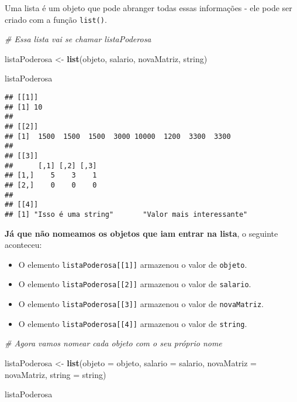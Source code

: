 \documentclass[
]{article}
\newenvironment{Shaded}{\begin{snugshade}}{\end{snugshade}}
\newcommand{\CommentTok}[1]{\textcolor[rgb]{0.56,0.35,0.01}{\textit{#1}}}
\newcommand{\DataTypeTok}[1]{\textcolor[rgb]{0.13,0.29,0.53}{#1}}
\newcommand{\KeywordTok}[1]{\textcolor[rgb]{0.13,0.29,0.53}{\textbf{#1}}}
\newcommand{\NormalTok}[1]{#1}
\newcommand{\StringTok}[1]{\textcolor[rgb]{0.31,0.60,0.02}{#1}}
\begin{document}
Uma lista é um objeto que pode abranger todas essas informações - ele
pode ser criado com a função \texttt{list()}.

\begin{Shaded}
\begin{Highlighting}[]
\CommentTok{# Essa lista vai se chamar listaPoderosa}

\NormalTok{listaPoderosa <-}\StringTok{ }\KeywordTok{list}\NormalTok{(objeto, salario, novaMatriz, string)}

\NormalTok{listaPoderosa}
\end{Highlighting}
\end{Shaded}

\begin{verbatim}
## [[1]]
## [1] 10
## 
## [[2]]
## [1]  1500  1500  1500  3000 10000  1200  3300  3300
## 
## [[3]]
##      [,1] [,2] [,3]
## [1,]    5    3    1
## [2,]    0    0    0
## 
## [[4]]
## [1] "Isso é uma string"       "Valor mais interessante"
\end{verbatim}

\textbf{Já que não nomeamos os objetos que iam entrar na lista}, o
seguinte aconteceu:

\begin{itemize}
\item
  O elemento \texttt{listaPoderosa{[}{[}1{]}{]}} armazenou o valor de
  \texttt{objeto}.
\item
  O elemento \texttt{listaPoderosa{[}{[}2{]}{]}} armazenou o valor de
  \texttt{salario}.
\item
  O elemento \texttt{listaPoderosa{[}{[}3{]}{]}} armazenou o valor de
  \texttt{novaMatriz}.
\item
  O elemento \texttt{listaPoderosa{[}{[}4{]}{]}} armazenou o valor de
  \texttt{string}.
\end{itemize}

\begin{Shaded}
\begin{Highlighting}[]
\CommentTok{# Agora vamos nomear cada objeto com o seu próprio nome}

\NormalTok{listaPoderosa <-}\StringTok{ }\KeywordTok{list}\NormalTok{(}\DataTypeTok{objeto =}\NormalTok{ objeto, }
                      \DataTypeTok{salario =}\NormalTok{ salario, }
                      \DataTypeTok{novaMatriz =}\NormalTok{ novaMatriz, }
                      \DataTypeTok{string =}\NormalTok{ string)}

\NormalTok{listaPoderosa}
\end{Highlighting}
\end{Shaded}
\end{document}
